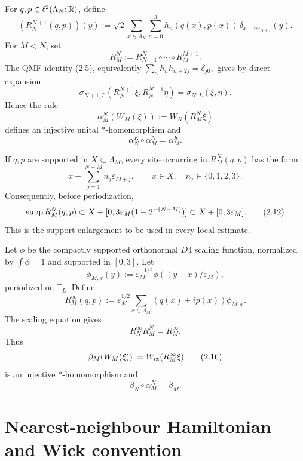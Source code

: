 \documentclass[11pt,a4paper]{article}
\newcommand{\eps}{\varepsilon}
\newcommand{\T}{\mathbb T}
\begin{document}

For \(q,p\in\ell^2(\Lambda_N;\mathbb R)\), define
\[
 (R_N^{N+1}(q,p))(y)
 :=\sqrt2\sum_{x\in\Lambda_N}\sum_{n=0}^3
       h_n(q(x),p(x))\,\delta_{x+n\eps_{N+1}}(y).               \tag{2.6}
\]
For \(M<N\), set
\[
 R_M^N:=R_{N-1}^N\circ\cdots\circ R_M^{M+1}.                   \tag{2.7}
\]
The QMF identity (2.5), equivalently
\(
 \sum_nh_nh_{n+2j}=\delta_{j0},
\)
gives by direct expansion
\[
 \sigma_{N+1,L}(R_N^{N+1}\xi,R_N^{N+1}\eta)
 =\sigma_{N,L}(\xi,\eta).                                      \tag{2.8}
\]
Hence the rule
\[
 \alpha_M^N(W_M(\xi)):=W_N(R_M^N\xi)                           \tag{2.9}
\]
defines an injective unital \( * \)-homomorphism and
\[
 \alpha_N^K\circ\alpha_M^N=\alpha_M^K.                         \tag{2.10}
\]


If \(q,p\) are supported in \(X\subset\Lambda_M\), every site occurring in
\(R_M^N(q,p)\) has the form
\[
 x+\sum_{j=1}^{N-M}n_j\eps_{M+j},\qquad x\in X,\quad
 n_j\in\{0,1,2,3\}.                                           \tag{2.11}
\]
Consequently, before periodization,
\[
 \supp R_M^N(q,p)
 \subset X+[0,3\eps_M(1-2^{-(N-M)})]
 \subset X+[0,3\eps_M].                                       \tag{2.12}
\]
This is the support enlargement to be used in every local estimate.


Let \(\phi\) be the compactly supported orthonormal \(D4\) scaling function,
normalized by \(\int\phi=1\) and supported in \([0,3]\).  Let
\[
 \phi_{M,x}(y):=\eps_M^{-1/2}\phi((y-x)/\eps_M),                \tag{2.13}
\]
periodized on \(\T_L\).  Define
\[
 R_M^\infty(q,p):=\eps_M^{1/2}\sum_{x\in\Lambda_M}
      (q(x)+ip(x))\phi_{M,x}.                                  \tag{2.14}
\]
The scaling equation gives
\[
 R_N^\infty R_M^N=R_M^\infty.                                 \tag{2.15}
\]
Thus
\[
 \beta_M(W_M(\xi)):=W_{\rm ct}(R_M^\infty\xi)                 \tag{2.16}
\]
is an injective \( * \)-homomorphism and
\[
 \beta_N\circ\alpha_M^N=\beta_M.                              \tag{2.17}
\]

\section{Nearest-neighbour Hamiltonian and Wick convention}

\end{document}
